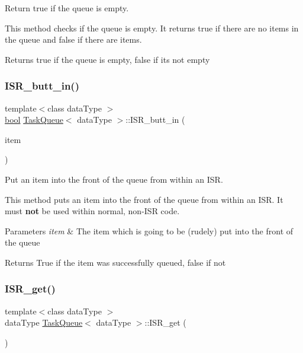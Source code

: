 Return true if the queue is empty. 

This method checks if the queue is empty. It returns {\ttfamily true} if there are no items in the queue and {\ttfamily false} if there are items. \begin{DoxyReturn}{Returns}
{\ttfamily true} if the queue is empty, {\ttfamily false} if it\textquotesingle{}s not empty 
\end{DoxyReturn}
\mbox{\label{class_task_queue_aa3d85ebdbee24d455f97b37a018f0230}} 
\subsubsection{\texorpdfstring{I\+S\+R\+\_\+butt\+\_\+in()}{ISR\_butt\_in()}}
{\footnotesize\ttfamily template$<$class data\+Type $>$ \\
\mbox{\hyperlink{group___motor___boolean___type_ga0ecf26b576b9a54eca656b9be7ba6a06}{bool}} \mbox{\hyperlink{class_task_queue}{Task\+Queue}}$<$ data\+Type $>$\+::I\+S\+R\+\_\+butt\+\_\+in (\begin{DoxyParamCaption}\item[{const data\+Type \&}]{item }\end{DoxyParamCaption})}



Put an item into the front of the queue from within an I\+SR. 

This method puts an item into the front of the queue from within an I\+SR. It must {\bfseries not} be used within normal, non-\/\+I\+SR code. 
\begin{DoxyParams}{Parameters}
{\em item} & The item which is going to be (rudely) put into the front of the queue \\
\hline
\end{DoxyParams}
\begin{DoxyReturn}{Returns}
True if the item was successfully queued, false if not 
\end{DoxyReturn}
\mbox{\label{class_task_queue_a57f0fd2a291dacf66983942b82e2997b}} 
\subsubsection{\texorpdfstring{I\+S\+R\+\_\+get()}{ISR\_get()}}
{\footnotesize\ttfamily template$<$class data\+Type $>$ \\
data\+Type \mbox{\hyperlink{class_task_queue}{Task\+Queue}}$<$ data\+Type $>$\+::I\+S\+R\+\_\+get (\begin{DoxyParamCaption}\item[{void}]{ }\end{DoxyParamCaption})\hspace{0.3cm}{\ttfamily [inline]}}



